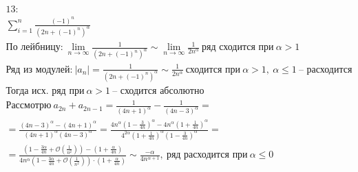 \begin{multline}
    \text{13:}\\
    \sum\limits_{i=1}^n \frac{(-1)^n}{(2n + (-1)^n)^{\alpha}}\\
    \text{По лейбницу:}\
    \lim\limits_{n \to \infty} \frac{1}{(2n + (-1)^n)^{\alpha}} \sim
    \lim\limits_{n \to \infty}\frac{1}{2n^{\alpha}}\
    \text{ряд сходится при}\ \alpha > 1\\
    \text{Ряд из модулей:}\
    |a_n| = \frac{1}{(2n + (-1)^n)^{\alpha}} \sim \frac{1}{2n^{\alpha}}\
    \text{сходится при}\ \alpha > 1,\ \alpha \leq 1\ \text{-- расходится}\\
    \text{Тогда исх. ряд при}\ \alpha > 1\ \text{-- сходится абсолютно}\\
    \text{Рассмотрю}\ a_{2n} + a_{2n - 1} = 
    \frac{1}{(4n + 1)^{\alpha}} - \frac{1}{(4n - 3)^{\alpha}} =\\
    = \frac{(4n - 3)^{\alpha} - (4n + 1)^{\alpha}}{(4n + 1)^{\alpha}(4n - 3)^{\alpha}} =
    \frac{4n^{\alpha}(1 - \frac{3}{4n})^{\alpha} - 4n^{\alpha}(1 + \frac{1}{4n})^{\alpha}}
    {4^{2\alpha}(1 + \frac{1}{4n})^{\alpha}(1 - \frac{3}{4n})^{\alpha}} =\\
    = \frac{(1 - \frac{3\alpha}{4n} + \mathcal{O}(\frac{1}{n^2})) - (1 + \frac{\alpha}{4n})}
    {4n^{\alpha}(1 - \frac{3\alpha}{4n} + \mathcal{O}(\frac{1}{n^2}))\cdot (1 + \frac{\alpha}{4n})}
    \sim \frac{-\alpha}{4n^{\alpha + 1}},\ \text{ряд расходится при}\ \alpha \leq 0\\
\end{multline}


